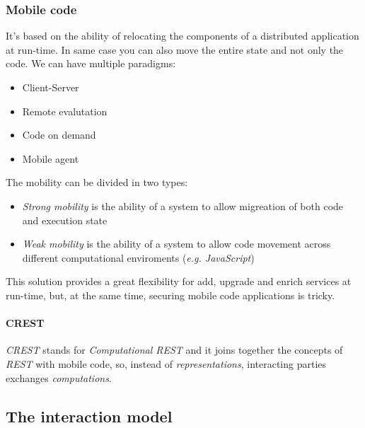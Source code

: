     \subsubsection{Mobile code}
    It's based on the ability of relocating the components of a distributed application at run-time.
    In same case you can also move the entire state and not only the code.
    We can have multiple paradigms:
    \begin{itemize}
        \item Client-Server
        \item Remote evalutation
        \item Code on demand
        \item Mobile agent
    \end{itemize}
    The mobility can be divided in two types:
    \begin{itemize}
        \item \textit{Strong mobility} is the ability of a system to allow migreation of both code and
            execution state
        \item \textit{Weak mobility} is the ability of a system to allow code movement across different
            computational enviroments (\textit{e.g. JavaScript})
    \end{itemize}
    This solution provides a great flexibility for add, upgrade and enrich services at run-time, but, 
    at the same time, securing mobile code applications is tricky.
    
    \paragraph{CREST}
    \textit{CREST} stands for \textit{Computational REST} and it joins together the concepts of \textit{REST}
    with mobile code, so, instead of \textit{representations}, interacting parties exchanges \textit{computations}.

    \subsection{The interaction model}
